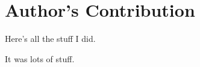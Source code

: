 
\chapter{Author's Contribution}  %

\ifpdf
    \graphicspath{{Contribution/Figs/Raster/}{Contribution/Figs/PDF/}{Contribution/Figs/}}
\else
    \graphicspath{{Contribution/Figs/Vector/}{Contribution/Figs/}}
\fi


\label{sec:contribution}

Here's all the stuff I did.

It was lots of stuff.
